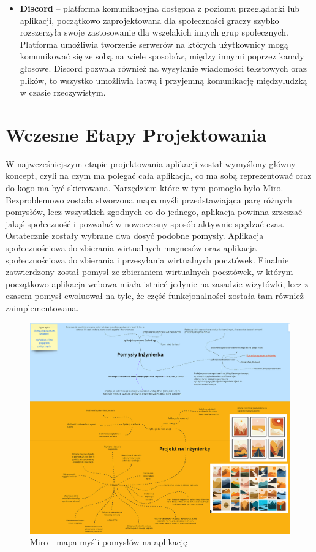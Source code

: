 \documentclass[a4paper,twoside,12pt]{book}
\begin{document}
\begin{itemize}
    \item \textbf{Discord} -- platforma komunikacyjna dostępna z poziomu przeglądarki lub aplikacji, początkowo zaprojektowana dla społeczności graczy szybko rozszerzyła swoje zastosowanie dla wszelakich innych grup społecznych. Platforma umożliwia tworzenie serwerów na których użytkownicy mogą komunikować się ze sobą na wiele sposobów, między innymi poprzez kanały głosowe. Discord pozwala również na wysyłanie wiadomości tekstowych oraz plików, to wszystko umożliwia łatwą i przyjemną komunikację międzyludzką w czasie rzeczywistym.
\end{itemize}
\newpage

\section{Wczesne Etapy Projektowania}

W najwcześniejszym etapie projektowania aplikacji został wymyślony główny koncept, czyli na czym ma polegać cała aplikacja, co ma sobą reprezentować oraz do kogo ma być skierowana. Narzędziem które w tym pomogło było Miro. Bezproblemowo została stworzona mapa myśli przedstawiająca parę różnych pomysłów, lecz wszystkich zgodnych co do jednego, aplikacja powinna zrzeszać jakąś społeczność i pozwalać w nowoczesny sposób aktywnie spędzać czas. Ostatecznie zostały wybrane dwa dosyć podobne pomysły.
Aplikacja społecznościowa do zbierania wirtualnych magnesów oraz aplikacja społecznościowa do zbierania i przesyłania wirtualnych pocztówek. Finalnie zatwierdzony został pomysł ze zbieraniem wirtualnych pocztówek, w którym początkowo aplikacja webowa miała istnieć jedynie na zasadzie wizytówki, lecz z czasem pomysł ewoluował na tyle, że część funkcjonalności została tam również zaimplementowana.
\begin{figure}[H]
    \centering
    \includegraphics[width=1\textwidth]{wizje_ss/miro.png}
    \caption{Miro - mapa myśli pomysłów na aplikację}
\end{figure}
\newpage
\end{document}
